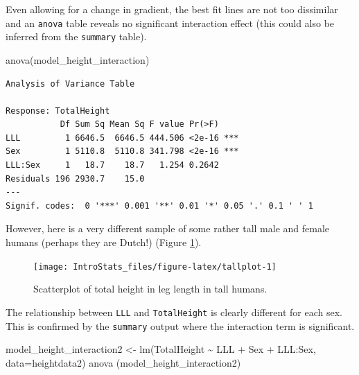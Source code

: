 \documentclass[
  oneside]{krantz}
\newenvironment{Shaded}{\begin{snugshade}}{\end{snugshade}}
\newcommand{\AttributeTok}[1]{\textcolor[rgb]{0.77,0.63,0.00}{#1}}
\newcommand{\FunctionTok}[1]{\textcolor[rgb]{0.00,0.00,0.00}{#1}}
\newcommand{\NormalTok}[1]{#1}
\newcommand{\OtherTok}[1]{\textcolor[rgb]{0.56,0.35,0.01}{#1}}
\newcommand{\SpecialCharTok}[1]{\textcolor[rgb]{0.00,0.00,0.00}{#1}}
\begin{document}
\newpage

Even allowing for a change in gradient, the best fit lines are not too dissimilar and an \texttt{anova} table reveals no significant interaction effect (this could also be inferred from the \texttt{summary} table).

\begin{Shaded}
\begin{Highlighting}[]
\FunctionTok{anova}\NormalTok{(model\_height\_interaction)}
\end{Highlighting}
\end{Shaded}

\begin{verbatim}
Analysis of Variance Table

Response: TotalHeight
           Df Sum Sq Mean Sq F value Pr(>F)    
LLL         1 6646.5  6646.5 444.506 <2e-16 ***
Sex         1 5110.8  5110.8 341.798 <2e-16 ***
LLL:Sex     1   18.7    18.7   1.254 0.2642    
Residuals 196 2930.7    15.0                   
---
Signif. codes:  0 '***' 0.001 '**' 0.01 '*' 0.05 '.' 0.1 ' ' 1
\end{verbatim}

However, here is a very different sample of some rather tall male and female humans (perhaps they are Dutch!) (Figure \ref{fig:tallplot}).

\begin{figure}

{\centering \texttt{[image: IntroStats\_files/figure-latex/tallplot-1]} 

}

\caption{Scatterplot of total height in leg length in tall humans.}\label{fig:tallplot}
\end{figure}

The relationship between \texttt{LLL} and \texttt{TotalHeight} is clearly different for each sex. This is confirmed by the \texttt{summary} output where the interaction term is significant.

\begin{Shaded}
\begin{Highlighting}[]
\NormalTok{model\_height\_interaction2 }\OtherTok{\textless{}{-}} \FunctionTok{lm}\NormalTok{(TotalHeight }\SpecialCharTok{\textasciitilde{}}\NormalTok{ LLL }\SpecialCharTok{+}\NormalTok{ Sex }\SpecialCharTok{+}\NormalTok{ LLL}\SpecialCharTok{:}\NormalTok{Sex, }\AttributeTok{data=}\NormalTok{heightdata2)}
\FunctionTok{anova}\NormalTok{ (model\_height\_interaction2)}
\end{Highlighting}
\end{Shaded}
\end{document}
